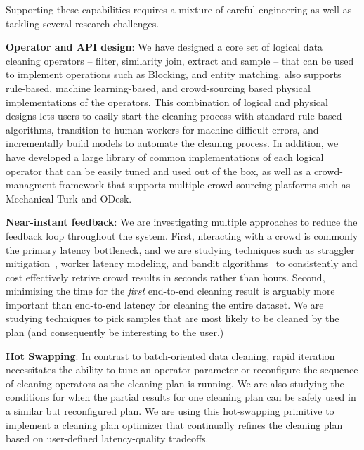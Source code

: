 Supporting these capabilities requires a mixture of careful engineering 
as well as tackling several research challenges.

\squishlist
\item {\bf Operator and API design}: We have designed a core set of logical data cleaning operators --
filter, similarity join, extract and sample -- that can be used to
implement operations such as Blocking, and entity matching.  \sys also supports
rule-based, machine learning-based, and crowd-sourcing based physical implementations of the operators.  
This combination of logical and physical designs lets users to easily start the cleaning process
with standard rule-based algorithms, transition to human-workers for machine-difficult 
errors, and incrementally build models to automate the cleaning process.  
In addition, we have developed a large library of common implementations of 
each logical operator that can be easily tuned and used out of the box, as well as a crowd-managment 
framework that supports multiple crowd-sourcing platforms such as Mechanical Turk and ODesk.

\item {\bf Near-instant feedback}: We are investigating multiple approaches to reduce the 
feedback loop throughout the system.  First, nteracting with a crowd is commonly the primary latency bottleneck,
and we are studying techniques such as straggler mitigation~\cite{venkataraman2014power}, worker latency modeling, and
bandit algorithms~\cite{} to consistently and cost effectively retrive crowd results in seconds rather than hours. 
Second, minimizing the time for the {\it first} end-to-end cleaning result is arguably more important than 
end-to-end latency for cleaning the entire dataset.    We are studying techniques to pick samples that are
most likely to be cleaned by the plan (and consequently be interesting to the user.)

\item {\bf Hot Swapping}: In contrast to batch-oriented data cleaning, rapid iteration necessitates the
ability to tune an operator parameter or reconfigure the sequence of cleaning operators as the cleaning
plan is running.   We are also studying the conditions for when the partial results for one
cleaning plan can be safely used in a similar but reconfigured plan.  We are using this hot-swapping primitive
to implement a cleaning plan optimizer that continually refines the cleaning plan based on user-defined latency-quality
tradeoffs.

